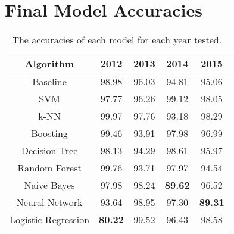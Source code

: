 \documentclass[12pt,twoside]{report}
\begin{document}
\chapter{Final Model Accuracies}
\label{app:modelAccuracies}
\vspace*{\fill}
\begin{table}[!hb]
\begin{center}
\begin{tabular}{|c|c|c|c|c|}\hline
	\textbf{Algorithm}	&\textbf{2012}	&\textbf{2013}	&\textbf{2014}	&\textbf{2015}\\\hline
	Baseline			&98.98			&96.03			&94.81			&95.06\\\hline
	SVM					&97.77			&96.26			&99.12			&98.05\\\hline
	k-NN				&99.97			&97.76			&93.18			&98.29\\\hline
	Boosting			&99.46			&93.91			&97.98			&96.99\\\hline
	Decision Tree		&98.13			&94.29			&98.61			&95.97\\\hline
	Random Forest		&99.76			&93.71			&97.97			&94.54\\\hline
	Naive Bayes			&97.98			&98.24			&\textbf{89.62}	&96.52\\\hline
	Neural Network		&93.64			&98.95			&97.30			&\textbf{89.31}\\\hline
	Logistic Regression	&\textbf{80.22}	&99.52			&96.43			&98.58\\\hline
\end{tabular}
\caption{The accuracies of each model for each year tested.}
\end{center}
\end{table}
\vspace*{\fill}
\newpage
\end{document}
